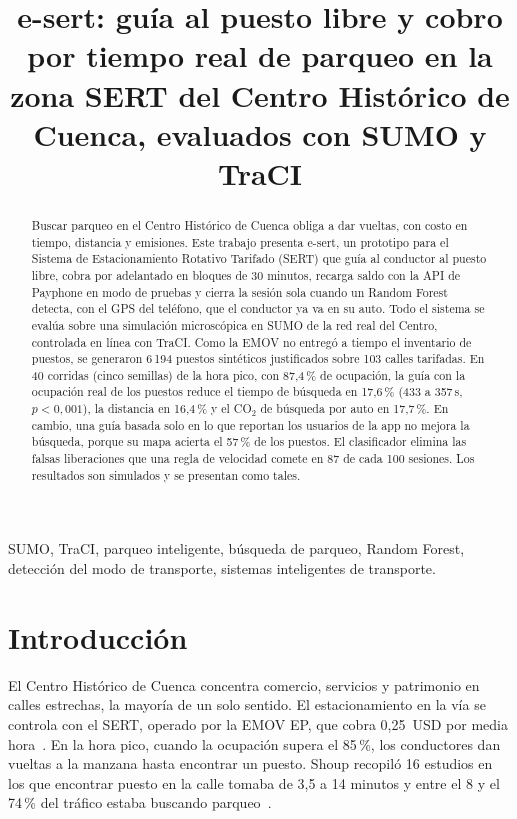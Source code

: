 \documentclass[conference]{IEEEtran}
\begin{document}
\title{e-sert: guía al puesto libre y cobro por tiempo real de parqueo en la zona SERT del Centro Histórico de Cuenca, evaluados con SUMO y TraCI}

\author{
}

\maketitle

\begin{abstract}
Buscar parqueo en el Centro Histórico de Cuenca obliga a dar vueltas, con costo en tiempo, distancia y emisiones. Este trabajo presenta e-sert, un prototipo para el Sistema de Estacionamiento Rotativo Tarifado (SERT) que guía al conductor al puesto libre, cobra por adelantado en bloques de 30 minutos, recarga saldo con la API de Payphone en modo de pruebas y cierra la sesión sola cuando un Random Forest detecta, con el GPS del teléfono, que el conductor ya va en su auto. Todo el sistema se evalúa sobre una simulación microscópica en SUMO de la red real del Centro, controlada en línea con TraCI. Como la EMOV no entregó a tiempo el inventario de puestos, se generaron 6\,194 puestos sintéticos justificados sobre 103 calles tarifadas. En 40 corridas (cinco semillas) de la hora pico, con 87,4\,\% de ocupación, la guía con la ocupación real de los puestos reduce el tiempo de búsqueda en 17,6\,\% (433 a 357\,s, $p<0{,}001$), la distancia en 16,4\,\% y el CO$_2$ de búsqueda por auto en 17,7\,\%. En cambio, una guía basada solo en lo que reportan los usuarios de la app no mejora la búsqueda, porque su mapa acierta el 57\,\% de los puestos. El clasificador elimina las falsas liberaciones que una regla de velocidad comete en 87 de cada 100 sesiones. Los resultados son simulados y se presentan como tales.
\end{abstract}

\begin{IEEEkeywords}
SUMO, TraCI, parqueo inteligente, búsqueda de parqueo, Random Forest, detección del modo de transporte, sistemas inteligentes de transporte.
\end{IEEEkeywords}

\section{Introducción}
El Centro Histórico de Cuenca concentra comercio, servicios y patrimonio en calles estrechas, la mayoría de un solo sentido. El estacionamiento en la vía se controla con el SERT, operado por la EMOV EP, que cobra 0,25~USD por media hora~\cite{concejo2012sert}. En la hora pico, cuando la ocupación supera el 85\,\%, los conductores dan vueltas a la manzana hasta encontrar un puesto. Shoup recopiló 16 estudios en los que encontrar puesto en la calle tomaba de 3,5 a 14 minutos y entre el 8 y el 74\,\% del tráfico estaba buscando parqueo~\cite{shoup2006cruising}.
\end{document}
